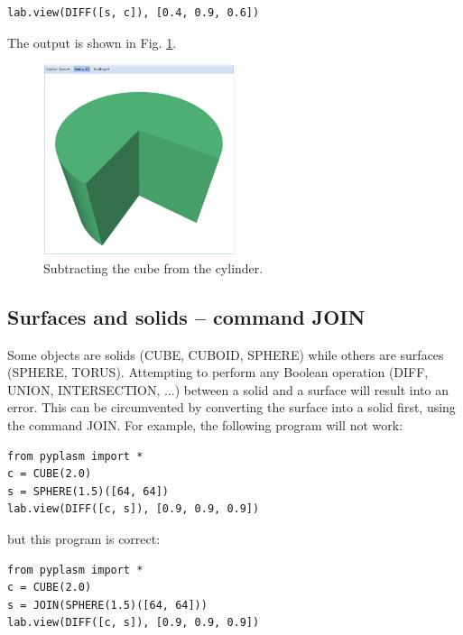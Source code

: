 \documentclass{article}
\begin{document}
\begin{verbatim}
lab.view(DIFF([s, c]), [0.4, 0.9, 0.6]) 
\end{verbatim}
The output is shown in Fig. \ref{fig:diff-2}.

\newpage

\begin{figure}[!ht]
\begin{center}
\includegraphics[width=0.5\textwidth]{img/diff-2.png}
\end{center}
\vspace{-2mm}
\caption{Subtracting the cube from the cylinder.}
\label{fig:diff-2}
\end{figure}
\noindent

\subsection{Surfaces and solids -- command JOIN} \label{par:join}

Some objects are solids (CUBE, CUBOID, SPHERE) while others are surfaces (SPHERE, TORUS). 
Attempting to perform any Boolean operation (DIFF, UNION, INTERSECTION, ...) between
a solid and a surface will result into an error. This can be circumvented by 
converting the surface into a solid first, using the command JOIN. For example,
the following program will not work:

\begin{verbatim}
from pyplasm import *
c = CUBE(2.0)
s = SPHERE(1.5)([64, 64])
lab.view(DIFF([c, s]), [0.9, 0.9, 0.9])
\end{verbatim}
but this program is correct:

\begin{verbatim}
from pyplasm import *
c = CUBE(2.0)
s = JOIN(SPHERE(1.5)([64, 64]))
lab.view(DIFF([c, s]), [0.9, 0.9, 0.9])
\end{verbatim}
\end{document}
